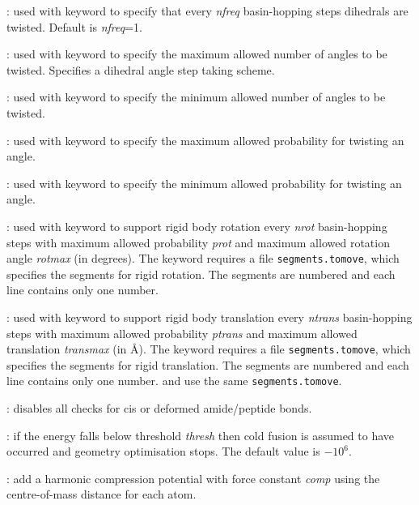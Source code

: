 : used with {} keyword to specify that every
{\it nfreq} basin-hopping steps dihedrals are twisted. Default is {\it nfreq}=1.

: used with {} keyword to specify the maximum allowed
number of angles to be twisted. Specifies a dihedral angle step taking scheme. 

: used with {} keyword to specify the minimum allowed
number of angles to be twisted.

: used with {} keyword to specify the maximum allowed
probability for twisting an angle.

: used with {} keyword to specify the minimum allowed
probability for twisting an angle.

: used with {} keyword 
to support rigid body rotation every {\it nrot} basin-hopping steps with maximum allowed 
probability {\it prot} and maximum allowed rotation angle {\it rotmax} (in degrees). 
The keyword {} requires a file {\tt segments.tomove}, which specifies
the segments for rigid rotation. The segments are numbered and each line contains only one number.

: used with {} keyword 
to support rigid body translation every {\it ntrans} basin-hopping steps with maximum allowed 
probability {\it ptrans} and maximum allowed translation {\it transmax} (in \AA). 
The keyword {} requires a file {\tt segments.tomove}, which specifies
the segments for rigid translation. The segments are numbered and each line contains only one number.
{} and {} use the same {\tt segments.tomove}.


: disables all checks for cis or deformed amide/peptide bonds.

: if the energy falls below threshold {\it thresh} then
cold fusion is assumed to have occurred and geometry optimisation stops.
The default value is $-10^6$.

: add a harmonic compression potential with force constant {\it comp\/} using the
centre-of-mass distance for each atom.

